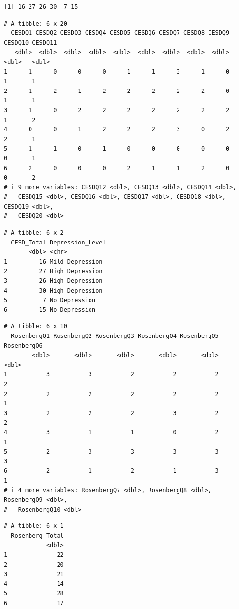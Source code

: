 \documentclass[
]{article}
\begin{document}
\begin{verbatim}
[1] 16 27 26 30  7 15
\end{verbatim}

\begin{verbatim}
# A tibble: 6 x 20
  CESDQ1 CESDQ2 CESDQ3 CESDQ4 CESDQ5 CESDQ6 CESDQ7 CESDQ8 CESDQ9 CESDQ10 CESDQ11
   <dbl>  <dbl>  <dbl>  <dbl>  <dbl>  <dbl>  <dbl>  <dbl>  <dbl>   <dbl>   <dbl>
1      1      0      0      0      1      1      3      1      0       1       1
2      1      2      1      2      2      2      2      2      0       1       1
3      1      0      2      2      2      2      2      2      2       1       2
4      0      0      1      2      2      2      3      0      2       2       1
5      1      1      0      1      0      0      0      0      0       0       1
6      2      0      0      0      2      1      1      2      0       0       2
# i 9 more variables: CESDQ12 <dbl>, CESDQ13 <dbl>, CESDQ14 <dbl>,
#   CESDQ15 <dbl>, CESDQ16 <dbl>, CESDQ17 <dbl>, CESDQ18 <dbl>, CESDQ19 <dbl>,
#   CESDQ20 <dbl>
\end{verbatim}

\begin{verbatim}
# A tibble: 6 x 2
  CESD_Total Depression_Level
       <dbl> <chr>           
1         16 Mild Depression 
2         27 High Depression 
3         26 High Depression 
4         30 High Depression 
5          7 No Depression   
6         15 No Depression   
\end{verbatim}

\begin{verbatim}
# A tibble: 6 x 10
  RosenbergQ1 RosenbergQ2 RosenbergQ3 RosenbergQ4 RosenbergQ5 RosenbergQ6
        <dbl>       <dbl>       <dbl>       <dbl>       <dbl>       <dbl>
1           3           3           2           2           2           2
2           2           2           2           2           2           1
3           2           2           2           3           2           2
4           3           1           1           0           2           1
5           2           3           3           3           3           3
6           2           1           2           1           3           1
# i 4 more variables: RosenbergQ7 <dbl>, RosenbergQ8 <dbl>, RosenbergQ9 <dbl>,
#   RosenbergQ10 <dbl>
\end{verbatim}

\begin{verbatim}
# A tibble: 6 x 1
  Rosenberg_Total
            <dbl>
1              22
2              20
3              21
4              14
5              28
6              17
\end{verbatim}
\end{document}
